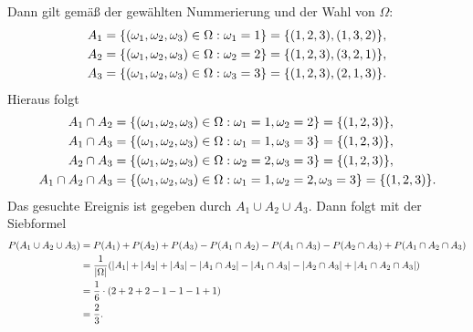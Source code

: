 \documentclass{exercise}
\begin{document}
\begin{enumerate}
        Dann gilt gemäß der gewählten Nummerierung und der Wahl von \(\Omega\):
        \begin{align*}
            A_1 &= \braces*{\parentheses*{\omega_1, \omega_2, \omega_3} \in \Omega : \omega_1 = 1} = \braces*{\parentheses*{1, 2, 3}, \parentheses*{1, 3, 2}},\\
            A_2 &= \braces*{\parentheses*{\omega_1, \omega_2, \omega_3} \in \Omega : \omega_2 = 2} = \braces*{\parentheses*{1, 2, 3}, \parentheses*{3, 2, 1}},\\
            A_3 &= \braces*{\parentheses*{\omega_1, \omega_2, \omega_3} \in \Omega : \omega_3 = 3} = \braces*{\parentheses*{1, 2, 3}, \parentheses*{2, 1, 3}}.
        \end{align*}
        Hieraus folgt
        \begin{align*}
            A_1 \cap A_2 &= \braces*{\parentheses*{\omega_1, \omega_2, \omega_3} \in \Omega : \omega_1 = 1, \omega_2 = 2} = \braces*{\parentheses*{1, 2, 3}},\\
            A_1 \cap A_3 &= \braces*{\parentheses*{\omega_1, \omega_2, \omega_3} \in \Omega : \omega_1 = 1, \omega_3 = 3} = \braces*{\parentheses*{1, 2, 3}},\\
            A_2 \cap A_3 &= \braces*{\parentheses*{\omega_1, \omega_2, \omega_3} \in \Omega : \omega_2 = 2, \omega_3 = 3} = \braces*{\parentheses*{1, 2, 3}},\\
            A_1 \cap A_2 \cap A_3 &= \braces*{\parentheses*{\omega_1, \omega_2, \omega_3} \in \Omega : \omega_1 = 1, \omega_2 = 2, \omega_3 = 3} = \braces*{\parentheses*{1, 2, 3}}.
        \end{align*}
        Das gesuchte Ereignis ist gegeben durch \(A_1 \cup A_2 \cup A_3\).
        Dann folgt mit der Siebformel
        \begin{align*}
            P\parentheses*{A_1 \cup A_2 \cup A_3} &= P\parentheses*{A_1} + P\parentheses*{A_2} + P\parentheses*{A_3} - P\parentheses*{A_1 \cap A_2} - P\parentheses*{A_1 \cap A_3} - P\parentheses*{A_2 \cap A_3} + P\parentheses*{A_1 \cap A_2 \cap A_3}\\
            &= \frac{1}{\absolute*{\Omega}}\parentheses*{\absolute*{A_1} + \absolute*{A_2} + \absolute*{A_3} - \absolute*{A_1 \cap A_2} - \absolute*{A_1 \cap A_3} - \absolute*{A_2 \cap A_3} + \absolute*{A_1 \cap A_2 \cap A_3}}\\
            &= \frac{1}{6} \cdot \parentheses*{2 + 2 + 2 - 1 - 1 - 1 + 1}\\
            &= \frac{2}{3}.
        \end{align*}
    \end{enumerate}
\end{document}
